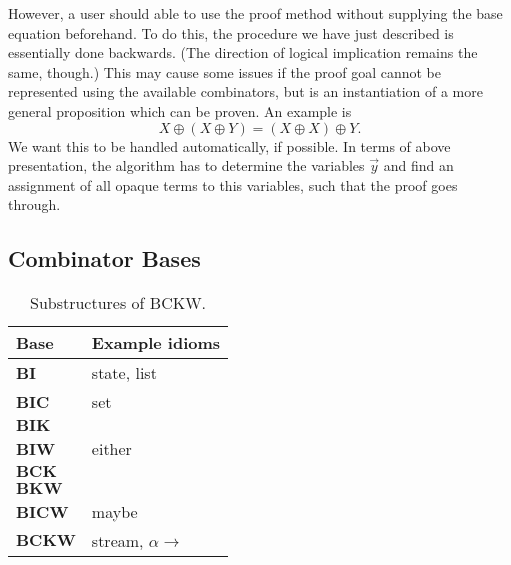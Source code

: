 However, a user should able to use the proof method without supplying the base
equation beforehand.
To do this, the procedure we have just described is essentially done backwards.
(The direction of logical implication remains the same, though.)
This may cause some issues if the proof goal cannot be represented using the
available combinators, but is an instantiation of a more general proposition
which can be proven.
An example is
\[ X \oplus (X \oplus Y) = (X \oplus X) \oplus Y. \]
We want this to be handled automatically, if possible.
In terms of above presentation, the algorithm has to determine the variables
$\vec y$ and find an assignment of all opaque terms to this variables, such
that the proof goes through.

\subsection{Combinator Bases}\label{subsec:combinator-bases}

\begin{table}\centering
\begin{tabular}{ll}
Base & Example idioms \\
\hline
$\mathbf{BI}$ & state, list \\
$\mathbf{BIC}$ & set \\
$\mathbf{BIK}$ & \\
$\mathbf{BIW}$ & either \\
$\mathbf{BCK}$ & \\
$\mathbf{BKW}$ & \\
$\mathbf{BICW}$ & maybe \\
$\mathbf{BCKW}$ & stream, $\alpha \to$ \\
\end{tabular}
\caption{Substructures of BCKW.}
\label{tab:combinator-bases}
\end{table}

\todo
